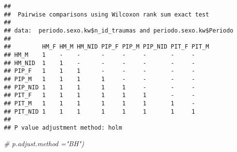 \documentclass[
]{article}
\newenvironment{Shaded}{\begin{snugshade}}{\end{snugshade}}
\newcommand{\CommentTok}[1]{\textcolor[rgb]{0.56,0.35,0.01}{\textit{#1}}}
\begin{document}
\begin{verbatim}
## 
##  Pairwise comparisons using Wilcoxon rank sum exact test 
## 
## data:  periodo.sexo.kw$n_id_traumas and periodo.sexo.kw$Periodo 
## 
##         HM_F HM_M HM_NID PIP_F PIP_M PIP_NID PIT_F PIT_M
## HM_M    1    -    -      -     -     -       -     -    
## HM_NID  1    1    -      -     -     -       -     -    
## PIP_F   1    1    1      -     -     -       -     -    
## PIP_M   1    1    1      1     -     -       -     -    
## PIP_NID 1    1    1      1     1     -       -     -    
## PIT_F   1    1    1      1     1     1       -     -    
## PIT_M   1    1    1      1     1     1       1     -    
## PIT_NID 1    1    1      1     1     1       1     1    
## 
## P value adjustment method: holm
\end{verbatim}

\begin{Shaded}
\begin{Highlighting}[]
\CommentTok{\# p.adjust.method ="BH")}
\end{Highlighting}
\end{Shaded}
\end{document}
